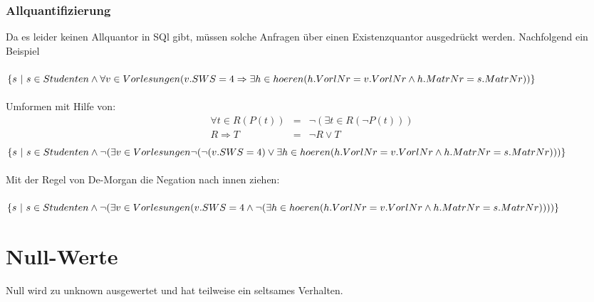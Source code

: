 \subsubsection{Allquantifizierung}
Da es leider keinen Allquantor in SQl gibt, müssen solche Anfragen über einen Existenzquantor ausgedrückt werden. Nachfolgend ein Beispiel \\
\qquad\\
$\{s~|~s\in Studenten \wedge \forall v \in Vorlesungen ( v.SWS = 4\Rightarrow \\ \exists h \in hoeren ( h.VorlNr = v. VorlNr \wedge h.MatrNr = s.MatrNr)) \}$\\
\qquad\\
Umformen mit Hilfe von:\\
\[\begin{array}{lcl}
\forall t\in R(P(t)) &=& \neg(\exists t \in R(\neg P(t))) \\
R \Rightarrow T &=& \neg R \vee T\\
\end{array}\]
$\{s~|~s\in Studenten \wedge \neg (\exists v \in Vorlesungen \neg(\neg( v.SWS = 4 )\vee \\ \exists h \in hoeren ( h.VorlNr = v. VorlNr \wedge h.MatrNr = s.MatrNr))) \}$\\
\qquad \\
Mit der Regel von De-Morgan die Negation nach innen ziehen:\\
\qquad\\
$\{s~|~s\in Studenten \wedge \neg (\exists v \in Vorlesungen ( v.SWS = 4 \wedge \\ \neg(\exists h \in hoeren ( h.VorlNr = v. VorlNr \wedge h.MatrNr = s.MatrNr)))) \}$\\
\section{Null-Werte}
Null wird zu unknown ausgewertet und hat teilweise ein seltsames Verhalten.\\

